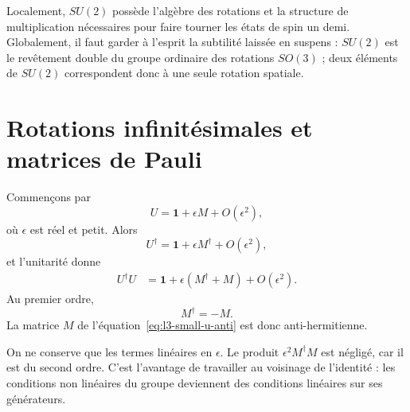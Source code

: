 Localement, \(SU(2)\) possède l’algèbre des rotations et la structure de multiplication nécessaires pour faire tourner les états de spin un demi. Globalement, il faut garder à l’esprit la subtilité laissée en suspens : \(SU(2)\) est le revêtement double du groupe ordinaire des rotations \(SO(3)\) ; deux éléments de \(SU(2)\) correspondent donc à une seule rotation spatiale. 

\section{Rotations infinitésimales et matrices de Pauli}

\begin{classroomqa}\end{classroomqa}

Commençons par
\begin{equation}
U=\boldsymbol 1+\epsilon M+O(\epsilon^2),
\label{eq:l3-small-u-anti}
\end{equation}
où \(\epsilon\) est réel et petit. Alors
\begin{equation}
U^\dagger=\boldsymbol 1+\epsilon M^\dagger+O(\epsilon^2),
\end{equation}
et l’unitarité donne
\begin{align}
U^\dagger U
 &=\boldsymbol 1+\epsilon(M^\dagger+M)+O(\epsilon^2).
\end{align}
Au premier ordre,
\begin{equation}
M^\dagger=-M.
\end{equation}
La matrice \(M\) de l’équation~\eqref{eq:l3-small-u-anti} est donc anti-hermitienne.

On ne conserve que les termes linéaires en \(\epsilon\). Le produit \(\epsilon^2M^\dagger M\) est négligé, car il est du second ordre. C’est l’avantage de travailler au voisinage de l’identité : les conditions non linéaires du groupe deviennent des conditions linéaires sur ses générateurs.

